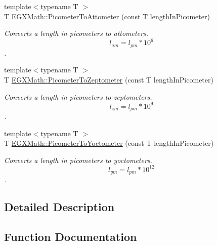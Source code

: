 \begin{DoxyCompactItemize}
{\footnotesize template$<$typename T $>$ }\\T \mbox{\hyperlink{group___e_g_x_math-_conversions-_length_conversions-_s_i-_picometer-_s_i_gaa71938201fdcd55422eb1b12de6aa043}{E\+G\+X\+Math\+::\+Picometer\+To\+Attometer}} (const T length\+In\+Picometer)
\begin{DoxyCompactList}\small\item\em Converts a length in picometers to attometers. \[ l_{am}=l_{pm} * 10^{6} \]. \end{DoxyCompactList}\item 
{\footnotesize template$<$typename T $>$ }\\T \mbox{\hyperlink{group___e_g_x_math-_conversions-_length_conversions-_s_i-_picometer-_s_i_ga6aa4200739cdc21650592e995e8945cd}{E\+G\+X\+Math\+::\+Picometer\+To\+Zeptometer}} (const T length\+In\+Picometer)
\begin{DoxyCompactList}\small\item\em Converts a length in picometers to zeptometers. \[ l_{zm}=l_{pm} * 10^{9} \]. \end{DoxyCompactList}\item 
{\footnotesize template$<$typename T $>$ }\\T \mbox{\hyperlink{group___e_g_x_math-_conversions-_length_conversions-_s_i-_picometer-_s_i_ga503eda76d6647261c50ec147c78dfbbc}{E\+G\+X\+Math\+::\+Picometer\+To\+Yoctometer}} (const T length\+In\+Picometer)
\begin{DoxyCompactList}\small\item\em Converts a length in picometers to yoctometers. \[ l_{ym}=l_{pm} * 10^{12} \]. \end{DoxyCompactList}\end{DoxyCompactItemize}


\subsection{Detailed Description}


\subsection{Function Documentation}
\mbox{\label{group___e_g_x_math-_conversions-_length_conversions-_s_i-_picometer-_s_i_gaa71938201fdcd55422eb1b12de6aa043}} 
